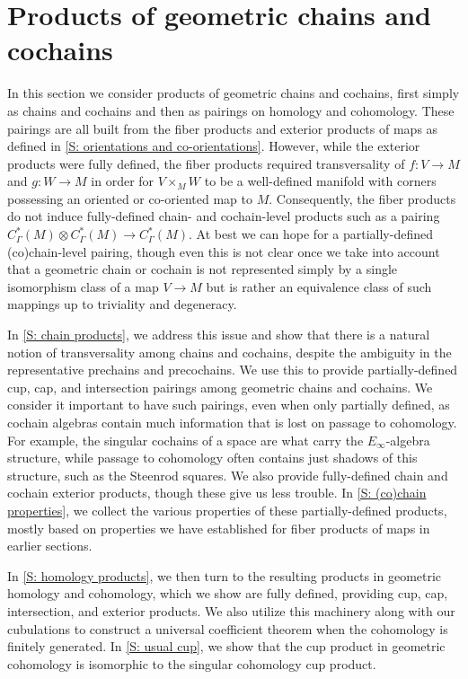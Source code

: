 
\section{Products of geometric chains and cochains}\label{S: products}

In this section we consider products of geometric chains and cochains, first simply as chains and cochains and then as pairings on homology and cohomology.
These pairings are all built from the fiber products and exterior products of maps as defined in \cref{S: orientations and co-orientations}.
However, while the exterior products were fully defined, the fiber products required transversality of $f \colon V \to M$ and $g \colon W \to M$ in order for $V \times_M W$ to be a well-defined manifold with corners possessing an oriented or co-oriented map to $M$.
Consequently, the fiber products do not induce fully-defined chain- and cochain-level products such as a pairing $C^*_\Gamma(M) \otimes C^*_\Gamma(M) \to C^*_\Gamma(M)$.
At best we can hope for a partially-defined (co)chain-level pairing, though even this is not clear once we take into account that a geometric chain or cochain is not represented simply by a single isomorphism class of a map $V \to M$ but is rather an equivalence class of such mappings up to triviality and degeneracy.

In \cref{S: chain products}, we address this issue and show that there is a natural notion of transversality among chains and cochains, despite the ambiguity in the representative prechains and precochains.
We use this to provide partially-defined cup, cap, and intersection pairings among geometric chains and cochains.
We consider it important to have such pairings, even when only partially defined, as cochain algebras contain much information that is lost on passage to cohomology.
For example, the singular cochains of a space are what carry the $E_\infty$-algebra structure, while passage to cohomology often contains just shadows of this structure, such as the Steenrod squares.
We also provide fully-defined chain and cochain exterior products, though these give us less trouble.
In \cref{S: (co)chain properties}, we collect the various properties of these partially-defined products, mostly based on properties we have established for fiber products of maps in earlier sections.

In \cref{S: homology products}, we then turn to the resulting products in geometric homology and cohomology, which we show are fully defined, providing cup, cap, intersection, and exterior products.
We also utilize this machinery along with our cubulations to construct a universal coefficient theorem when the cohomology is finitely generated.
In \cref{S: usual cup}, we show that the cup product in geometric cohomology is isomorphic to the singular cohomology cup product.

